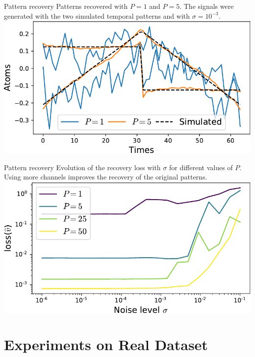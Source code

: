 \documentclass{beamer}
\begin{document}
\begin{frame}{Pattern recovery}
Patterns recovered with $P = 1$ and $P=5$. The signals were generated with the two simulated temporal patterns and with  $\sigma = 10^{-3}$. \\[1em]
\includegraphics[width=\textwidth]{1D_vs_multi_uv_hat_P5.pdf}
\end{frame}
\begin{frame}{Pattern recovery}
Evolution of the recovery loss with $\sigma$ for different values of $P$. Using more channels improves the recovery of the original patterns.\\[1em]
\includegraphics[width=\textwidth]{1D_vs_multi.pdf}
\end{frame}


\section{Experiments on Real Dataset}
\end{document}
